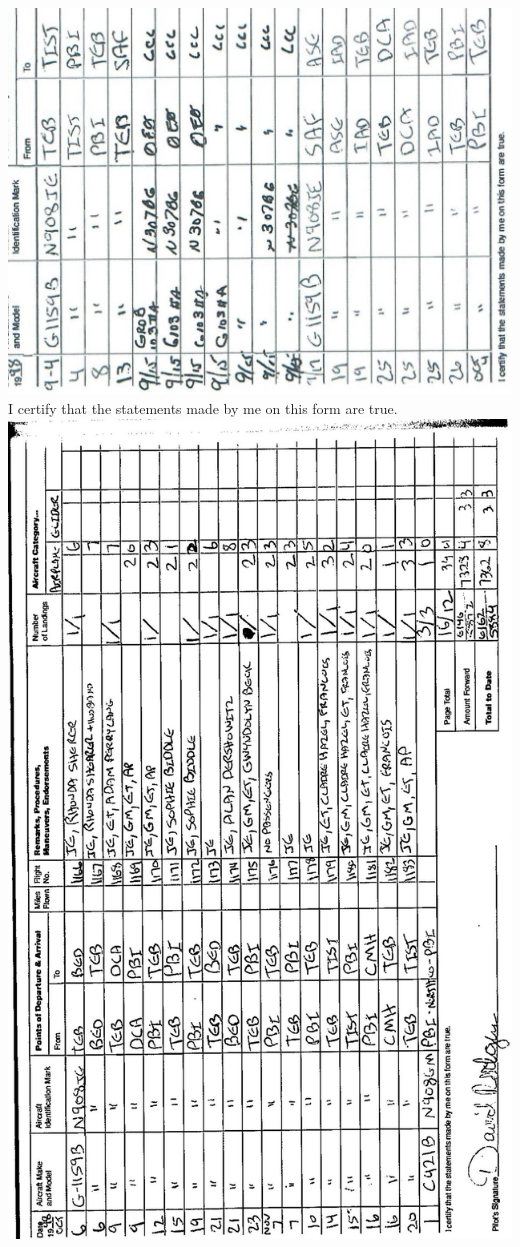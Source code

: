 \documentclass[10pt]{article}
\begin{document}
\includegraphics[max width=\textwidth, center]{2025_02_27_dd68c3d38de88f0516d9g-063(1)}\\
I certify that the statements made by me on this form are true.\\
\includegraphics[max width=\textwidth, center]{2025_02_27_dd68c3d38de88f0516d9g-064}\\
\end{document}

